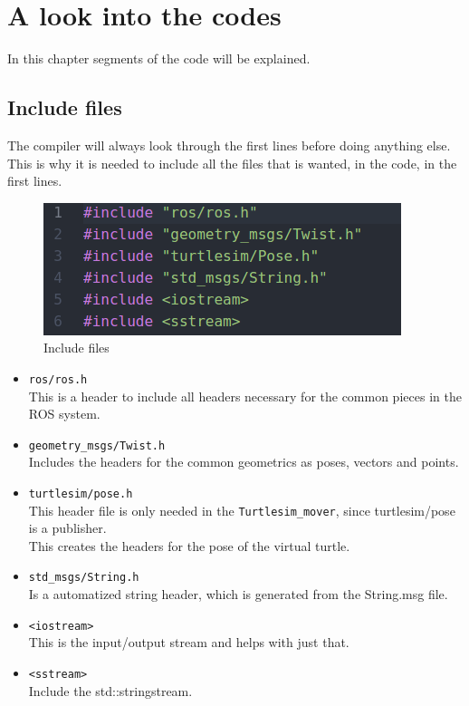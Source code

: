 \chapter{A look into the codes} \label{ch:lookinto}

In this chapter segments of the code will be explained.

\section{Include files} 

The compiler will always look through the first lines before doing anything else. This is why it is needed to include all the files that is wanted, in the code, in the first lines.\\

\begin{figure}[h]
\begin{center}
\includegraphics[width=.5\textwidth]{figures/therealinclude.png}
\caption{Include files}
\end{center}
\end{figure}\label{fig:include}

\begin{itemize}
\item \texttt{ros/ros.h}\\
This is a header to include all headers necessary for the common pieces in the ROS system.\\
\item \texttt{geometry\_msgs/Twist.h}\\
Includes the headers for the common geometrics as poses, vectors and points.\\
\item \texttt{turtlesim/pose.h}\\
This header file is only needed in the \texttt{Turtlesim\_mover}, since turtlesim/pose is a publisher.\\
This creates the headers for the pose of the virtual turtle.\\
\item \texttt{std\_msgs/String.h}\\
Is a automatized string header, which is generated from the String.msg file.\\
\item \texttt{<iostream>}\\
This is the input/output stream and helps with just that.\\
\item \texttt{<sstream>}\\
Include the std::stringstream.\\

\end{itemize}

